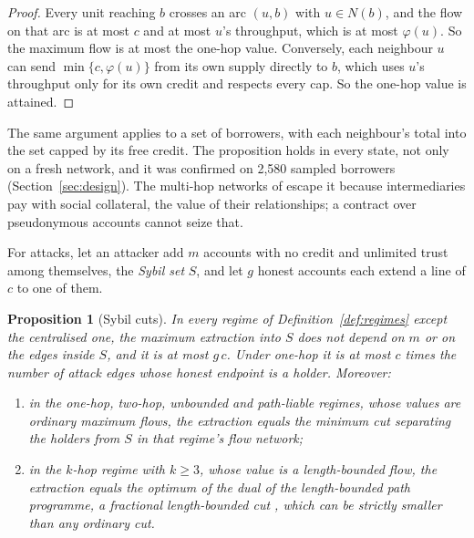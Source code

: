 \documentclass[11pt]{article}
\theoremstyle{plain}
\newtheorem{proposition}{Proposition}
\theoremstyle{definition}
\begin{document}
\begin{proof}
Every unit reaching $b$ crosses an arc $(u,b)$ with $u\in N(b)$, and the flow on that arc is at most
$c$ and at most $u$'s throughput, which is at most $\varphi(u)$. So the maximum flow is at most the
one-hop value. Conversely, each neighbour $u$ can send $\min\{c,\varphi(u)\}$ from its own supply
directly to $b$, which uses $u$'s throughput only for its own credit and respects every cap. So the
one-hop value is attained.
\end{proof}

The same argument applies to a set of borrowers, with each neighbour's total into the set capped by
its free credit. The proposition holds in every state, not only on a fresh network, and it was
confirmed on 2,580 sampled borrowers (Section~\ref{sec:design}). The multi-hop networks of
\citet{karlan2009trust} escape it because intermediaries pay with social collateral, the value of
their relationships; a contract over pseudonymous accounts cannot seize that.

For attacks, let an attacker add $m$ accounts with no credit and unlimited trust among themselves,
the \emph{Sybil set} $S$, and let $g$ honest accounts each extend a line of $c$ to one of them.

\begin{proposition}[Sybil cuts]\label{prop:sybil}
In every regime of Definition~\ref{def:regimes} except the centralised one, the maximum extraction
into $S$ does not depend on $m$ or on the edges inside $S$, and it is at most $g\,c$. Under one-hop
it is at most $c$ times the number of attack edges whose honest endpoint is a holder. Moreover:
\begin{enumerate}
\item[(a)] in the one-hop, two-hop, unbounded and path-liable regimes, whose values are ordinary
  maximum flows, the extraction equals the minimum cut separating the holders from $S$ in that
  regime's flow network;
\item[(b)] in the $k$-hop regime with $k\ge3$, whose value is a length-bounded flow, the extraction
  equals the optimum of the dual of the length-bounded path programme, a fractional length-bounded
  cut \citep{baier2010}, which can be strictly smaller than any ordinary cut.
\end{enumerate}
\end{proposition}
\end{document}

